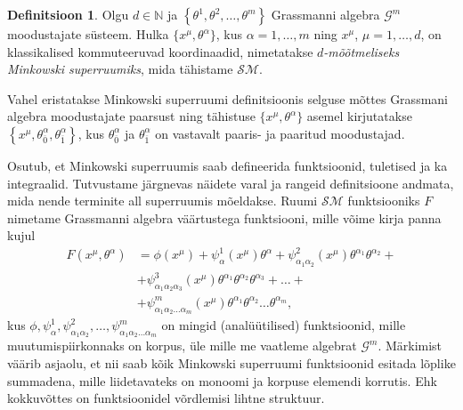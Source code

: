 \documentclass[12pt,a4paper,oneside]{article}
\theoremstyle{plain}
\theoremstyle{definition}
\newtheorem{definitsioon}{Definitsioon}[section]
\numberwithin{equation}{section}
\def\N{{\mathbb N}}
\def\G{{\mathcal G}}
\def\SM{{\mathcal {SM}}}
\begin{document}
\begin{definitsioon}
Olgu $d \in \N$ ja 
$\left\lbrace\theta^1, \theta^2, \ldots, \theta^m\right\rbrace$
Grassmanni algebra $\G^m$ moodustajate süsteem. 
Hulka $\{x^{\mu}, \theta^\alpha\}$, kus $\alpha = 1, \ldots, m$ ning 
$x^{\mu}$, $\mu = 1, \ldots, d$, on klassikalised kommuteeruvad 
koordinaadid, nimetatakse \emph{$d$-mõõtmeliseks Minkowski 
superruumiks}, mida tähistame $\SM$.
\end{definitsioon}

Vahel eristatakse Minkowski superruumi definitsioonis
selguse mõttes Grassmani algebra moodustajate paarsust ning 
tähistuse $\{x^{\mu}, \theta^\alpha\}$ asemel kirjutatakse 
$\left\lbrace x^{\mu}, \theta_{\overline{0}}^{\alpha}, 
\theta_{\overline{1}}^{\alpha} \right\rbrace$, kus 
$\theta_{\overline{0}}^{\alpha}$ 
ja $\theta_{\overline{1}}^{\alpha}$ on vastavalt paaris- ja paaritud 
moodustajad.

Osutub, et Minkowski superruumis saab defineerida 
funktsioonid, tuletised ja ka integraalid. Tutvustame 
järgnevas näidete varal ja rangeid definitsioone andmata, 
mida nende terminite all superruumis mõeldakse. Ruumi $\SM$ 
funktsiooniks $F$ nimetame Grassmanni algebra väärtustega 
funktsiooni, mille võime kirja panna kujul
\begin{align*}
F \left(x^{\mu}, \theta^{\alpha} \right) &= 
\phi \left(x^{\mu}\right) + 
\psi_{\alpha}^{1} \left(x^{\mu}\right) \theta^{\alpha} + 
\psi_{\alpha_1 \alpha_2}^{2} \left(x^{\mu}\right) 
	\theta^{\alpha_1} \theta^{\alpha_2} + \\
&+ \psi_{\alpha_1 \alpha_2 \alpha_3}^{3} \left(x^{\mu}\right) 
	\theta^{\alpha_1} \theta^{\alpha_2} \theta^{\alpha_3} + 
\ldots + \\
&+ \psi_{\alpha_1 \alpha_2 \ldots \alpha_m}^{m} 
	\left(x^{\mu}\right) \theta^{\alpha_1} \theta^{\alpha_2} 
	\ldots \theta^{\alpha_m}, 
\end{align*}
kus $\phi, \psi_{\alpha}^{1}, \psi_{\alpha_1 \alpha_2}^{2}, 
\ldots, \psi_{\alpha_1 \alpha_2 \ldots \alpha_m}^{m}$ on mingid 
(analüütilised) funktsioonid, mille muutumispiirkonnaks on 
korpus, üle mille me vaatleme algebrat $\G^m$. Märkimist väärib 
asjaolu, et nii saab kõik Minkowski superruumi 
funktsioonid esitada lõplike summadena, mille liidetavateks on 
monoomi ja korpuse elemendi korrutis. Ehk kokkuvõttes on 
funktsioonidel võrdlemisi lihtne struktuur. 
\end{document}
